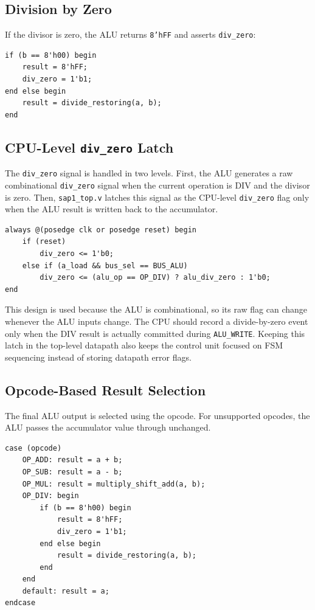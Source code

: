 \documentclass[12pt,a4paper]{article}
\begin{document}
\subsection{Division by Zero}

If the divisor is zero, the ALU returns \texttt{8'hFF} and asserts \texttt{div\_zero}:

\begin{lstlisting}[style=verilogstyle,caption={Division-by-zero handling}]
if (b == 8'h00) begin
    result = 8'hFF;
    div_zero = 1'b1;
end else begin
    result = divide_restoring(a, b);
end
\end{lstlisting}

\subsection{CPU-Level \texttt{div\_zero} Latch}

The \texttt{div\_zero} signal is handled in two levels. First, the ALU generates a raw combinational \texttt{div\_zero} signal when the current operation is DIV and the divisor is zero. Then, \texttt{sap1\_top.v} latches this signal as the CPU-level \texttt{div\_zero} flag only when the ALU result is written back to the accumulator.

\begin{lstlisting}[style=verilogstyle,caption={CPU-level div\_zero latch in sap1\_top.v}]
always @(posedge clk or posedge reset) begin
    if (reset)
        div_zero <= 1'b0;
    else if (a_load && bus_sel == BUS_ALU)
        div_zero <= (alu_op == OP_DIV) ? alu_div_zero : 1'b0;
end
\end{lstlisting}

This design is used because the ALU is combinational, so its raw flag can change whenever the ALU inputs change. The CPU should record a divide-by-zero event only when the DIV result is actually committed during \texttt{ALU\_WRITE}. Keeping this latch in the top-level datapath also keeps the control unit focused on FSM sequencing instead of storing datapath error flags.

\subsection{Opcode-Based Result Selection}

The final ALU output is selected using the opcode. For unsupported opcodes, the ALU passes the accumulator value through unchanged.

\begin{lstlisting}[style=verilogstyle,caption={Complete ALU operation selection}]
case (opcode)
    OP_ADD: result = a + b;
    OP_SUB: result = a - b;
    OP_MUL: result = multiply_shift_add(a, b);
    OP_DIV: begin
        if (b == 8'h00) begin
            result = 8'hFF;
            div_zero = 1'b1;
        end else begin
            result = divide_restoring(a, b);
        end
    end
    default: result = a;
endcase
\end{lstlisting}
\end{document}
